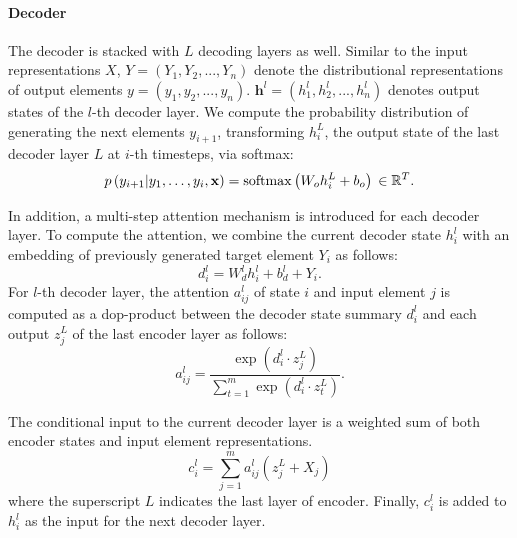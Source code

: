 \paragraph{Decoder}
The decoder is stacked with $L$ decoding layers as well.
Similar to the input representations $X$, 
$Y=(Y_1, Y_2, ..., Y_n)$ denote 
the distributional representations of output elements $y=(y_1, y_2, ..., y_n)$.
$\textbf{h}^l = (h^l_1, h^l_2, ..., h^l_n)$ denotes output states of the $l$-th decoder layer.
We compute the probability
distribution of generating the next elements $y_{i+1}$,
transforming $h_{i}^{L}$, the output state of the last decoder layer $L$ at $i$-th timesteps, via softmax:
\begin{equation}
p \left( y _ { i + 1 } | y _ { 1 } , \ldots , y _ { i } , \mathbf { x } \right) = 
\operatorname { softmax } \left( W _ { o } h _ { i } ^ { L } + b _ { o } \right) \\ 
\in \mathbb { R } ^ { T }.
\end{equation}

In addition, a multi-step attention mechanism is introduced for each decoder layer.
To compute the attention, we combine the current decoder state
$h^l_{i}$ with an embedding of previously generated target element $Y_{i}$
as follows:
\begin{equation}
d _ { i } ^ { l } = W _ { d } ^ { l } h _ { i } ^ { l } + b _ { d } ^ { l } + Y _ { i }.
\end{equation}
For $l$-th decoder layer, the attention $a^l_{ij}$ of state $i$ and input element $j$
is computed as a dop-product between the decoder state summary 
$d^l_i$ and each output $z^L_j$ of the last encoder layer as follows:
\begin{equation}\label{eq:a}
a _ { i j } ^ { l } = \frac { \exp \left( d _ { i } ^ { l } \cdot z _ { j } ^ { L } \right) } { \sum _ { t = 1 } ^ { m } \exp \left( d _ { i } ^ { l } \cdot z _ { t } ^ { L } \right) }.
\end{equation}

The conditional input to the current 
decoder layer is a weighted sum of both encoder states and input element representations.
\begin{equation}\label{eq:c}
c _ { i } ^ { l } = \sum _ { j = 1 } ^ { m } a _ { i j } ^ { l } \left( z _ { j } ^ { L } + X_j \right)
\end{equation}
where the superscript $L$ indicates the last layer of encoder.  
Finally, $c _ { i } ^ { l }$ is added to $h_{i}^{l}$ as the input for the next decoder layer.


